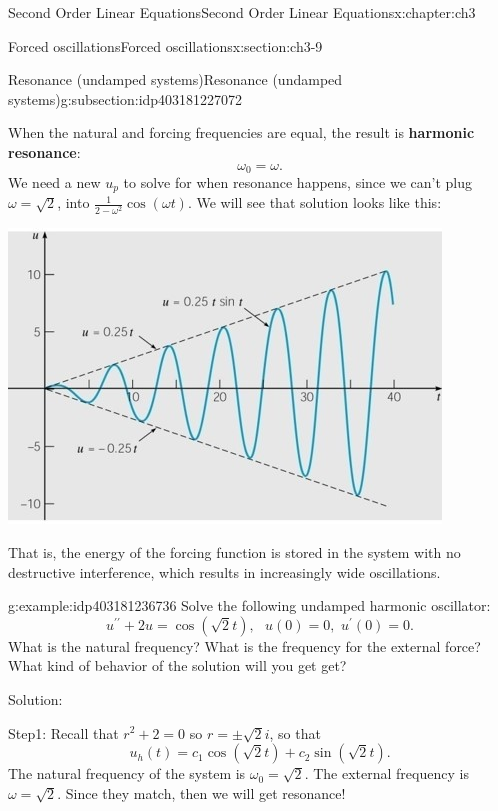 \documentclass[oneside,10pt,]{book}
\newcommand{\terminology}[1]{\textbf{#1}}
\numberwithin{equation}{section}
\numberwithin{equation}{section}
\begin{document}
\begin{chapterptx}{Second Order Linear Equations}{}{Second Order Linear Equations}{}{}{x:chapter:ch3}
\begin{sectionptx}{Forced oscillations}{}{Forced oscillations}{}{}{x:section:ch3-9}
\begin{subsectionptx}{Resonance (undamped systems)}{}{Resonance (undamped systems)}{}{}{g:subsection:idp403181227072}
\begin{image}{0}{1}{0}
\end{image}%
%
\par
When the natural and forcing frequencies are equal, the result is \terminology{harmonic resonance}:%
\begin{equation*}
\omega_{0}=\omega.
\end{equation*}
We need a new \(u_{p}\) to solve for when resonance happens, since we can't plug \(\omega=\sqrt{2}\), into \(\frac{1}{2-\omega^{2}}\cos\left(\omega t\right)\). We will see that solution looks like this: \begin{image}{0}{1}{0}%
\includegraphics[width=\linewidth]{images/3.8-3.jpg}
\end{image}%
 That is, the energy of the forcing function is stored in the system with no destructive interference, which results in increasingly wide oscillations.%
\begin{example}{}{g:example:idp403181236736}%
Solve the following undamped harmonic oscillator:%
\begin{equation*}
u^{\prime\prime}+2u=\cos\left(\sqrt{2}t\right),\,\,\,\,u(0)=0,\,\,u^{\prime}(0)=0.
\end{equation*}
What is the natural frequency? What is the frequency for the external force? What kind of behavior of the solution will you get get?%
\par
Solution:%
\par
Step1: Recall that \(r^{2}+2=0\) so \(r=\pm\sqrt{2}i\), so that%
\begin{equation*}
u_{h}(t)=c_{1}\cos\left(\sqrt{2}t\right)+c_{2}\sin\left(\sqrt{2}t\right).
\end{equation*}
The natural frequency of the system is \(\omega_{0}=\sqrt{2}\). The external frequency is \(\omega=\sqrt{2}\). Since they match, then we will get resonance!%

\end{example}
\end{subsectionptx}
\end{sectionptx}
\end{chapterptx}
\end{document}
